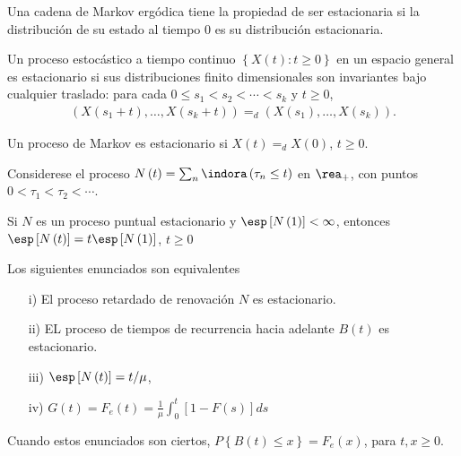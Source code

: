\begin{Note}
Una cadena de Markov erg\'odica tiene la propiedad de ser estacionaria si la distribuci\'on de su estado al tiempo $0$ es su distribuci\'on estacionaria.
\end{Note}


\begin{Def}
Un proceso estoc\'astico a tiempo continuo $\left\{X\left(t\right):t\geq0\right\}$ en un espacio general es estacionario si sus distribuciones finito dimensionales son invariantes bajo cualquier  traslado: para cada $0\leq s_{1}<s_{2}<\cdots<s_{k}$ y $t\geq0$,
\begin{eqnarray*}
\left(X\left(s_{1}+t\right),\ldots,X\left(s_{k}+t\right)\right)=_{d}\left(X\left(s_{1}\right),\ldots,X\left(s_{k}\right)\right).
\end{eqnarray*}
\end{Def}

\begin{Note}
Un proceso de Markov es estacionario si $X\left(t\right)=_{d}X\left(0\right)$, $t\geq0$.
\end{Note}

Considerese el proceso $N\left(t\right)=\sum_{n}\indora\left(\tau_{n}\leq t\right)$ en $\rea_{+}$, con puntos $0<\tau_{1}<\tau_{2}<\cdots$.

\begin{Prop}
Si $N$ es un proceso puntual estacionario y $\esp\left[N\left(1\right)\right]<\infty$, entonces $\esp\left[N\left(t\right)\right]=t\esp\left[N\left(1\right)\right]$, $t\geq0$

\end{Prop}

\begin{Teo}
Los siguientes enunciados son equivalentes
\begin{itemize}
\item[i)] El proceso retardado de renovaci\'on $N$ es estacionario.

\item[ii)] EL proceso de tiempos de recurrencia hacia adelante $B\left(t\right)$ es estacionario.


\item[iii)] $\esp\left[N\left(t\right)\right]=t/\mu$,


\item[iv)] $G\left(t\right)=F_{e}\left(t\right)=\frac{1}{\mu}\int_{0}^{t}\left[1-F\left(s\right)\right]ds$
\end{itemize}
Cuando estos enunciados son ciertos, $P\left\{B\left(t\right)\leq x\right\}=F_{e}\left(x\right)$, para $t,x\geq0$.

\end{Teo}

